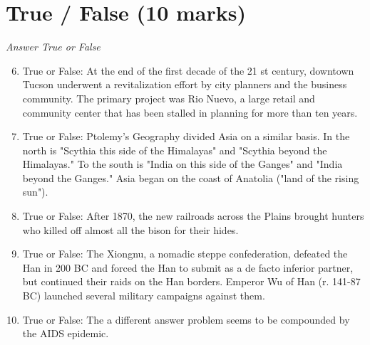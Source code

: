 \documentclass[12pt]{article}
\begin{document}
\section*{True / False (10 marks)}
\textit{Answer True or False}
\begin{enumerate}[label=\arabic*.]
\setcounter{enumi}{5}
\item True or False: At the end of the first decade of the 21 st century, downtown Tucson underwent a revitalization effort by city planners and the business community. The primary project was Rio Nuevo, a large retail and community center that has been stalled in planning for more than ten years.
\item True or False: Ptolemy's Geography divided Asia on a similar basis. In the north is "Scythia this side of the Himalayas" and "Scythia beyond the Himalayas." To the south is "India on this side of the Ganges" and "India beyond the Ganges." Asia began on the coast of Anatolia ("land of the rising sun").
\item True or False: After 1870, the new railroads across the Plains brought hunters who killed off almost all the bison for their hides.
\item True or False: The Xiongnu, a nomadic steppe confederation, defeated the Han in 200 BC and forced the Han to submit as a de facto inferior partner, but continued their raids on the Han borders. Emperor Wu of Han (r. 141-87 BC) launched several military campaigns against them.
\item True or False: The a different answer problem seems to be compounded by the AIDS epidemic.
\end{enumerate}
\end{document}
